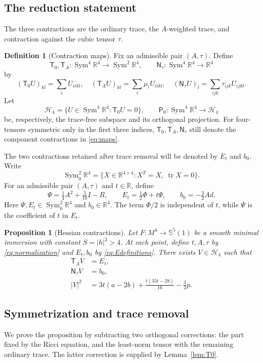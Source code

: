 \documentclass[11pt,a4paper]{amsart}
\numberwithin{equation}{section}
\newtheorem{proposition}[theorem]{Proposition}
\theoremstyle{definition}
\newtheorem{definition}[theorem]{Definition}
\theoremstyle{remark}
\DeclareMathOperator{\tr}{tr}
\DeclareMathOperator{\Sym}{Sym}
\newcommand{\R}{\mathbb R}
\newcommand{\Sph}{\mathbb S}
\newcommand{\T}{\mathsf T}
\newcommand{\N}{\mathsf N}
\newcommand{\Pz}{\mathsf P_0}
\newcommand{\Szero}{\operatorname{Sym}^2_0\R^4}
\newcommand{\Hfour}{\mathscr H_4}
\begin{document}
\subsection{The reduction statement}
The three contractions are the ordinary trace, the $A$-weighted trace,
and contraction against the cubic tensor $\tau$.

\begin{definition}[Contraction maps]\label{def:maps}
Fix an admissible pair $(A,\tau)$. Define
\[
 \T_0,\T_A:\Sym^4\R^4\longrightarrow\Sym^2\R^4,
 \qquad \N_\tau:\Sym^4\R^4\longrightarrow\R^4
\]
by
\begin{equation}\label{eq:maps}
 (\T_0U)_{kl}=\sum_iU_{iikl},\quad
 (\T_AU)_{kl}=\sum_i\mu_iU_{iikl},\quad
 (\N_\tau U)_l=\sum_{ijk}\tau_{ijk}U_{ijkl}.
\end{equation}
Let
\[
 \Hfour=\{U\in\Sym^4\R^4:\T_0U=0\},
 \qquad \Pz:\Sym^4\R^4\longrightarrow\Hfour
\]
be, respectively, the trace-free subspace and its orthogonal projection.
For four-tensors symmetric only in the first three indices,
$\T_0,\T_A,\N_\tau$ still denote the component contractions in
\eqref{eq:maps}.
\end{definition}

The two contractions retained after trace removal will be denoted by
$E_t$ and $b_0$. Write
\[
 \Szero=\{X\in\R^{4\times4}:X^T=X,\ \tr X=0\}.
\]
For an admissible pair $(A,\tau)$ and $t\in\R$, define
\begin{equation}\label{eq:Edefinitions}
 \Psi=\tfrac14A^2+\tfrac3{16}I-R,\qquad
 E_t=\tfrac12\Phi+t\Psi,\qquad b_0=-\tfrac32Ad.
\end{equation}
Here $\Psi,E_t\in\Szero$ and $b_0\in\R^4$. The term $\Phi/2$ is
independent of $t$, while $\Psi$ is the coefficient of $t$ in $E_t$.

\begin{proposition}[Hessian contractions]\label{prop:reduction}
Let $F:M^4\to\Sph^5(1)$ be a smooth minimal immersion with
constant $S=|h|^2>4$. At each point, define $t,A,\tau$ by
\eqref{eq:normalization} and $E_t,b_0$ by \eqref{eq:Edefinitions}.
There exists $V\in\Hfour$ such that
\begin{align}
 \T_AV&=E_t,\label{eq:Et}\\
 \N_\tau V&=b_0,\label{eq:b0}\\
 |V|^2&=3t(a-2b)+\frac{t(35t-28)}{16}-\tfrac32p.\label{eq:Vnorm}
\end{align}
\end{proposition}

\subsection{Symmetrization and trace removal}
We prove the proposition by subtracting two orthogonal corrections:
the part fixed by the Ricci equation, and the least-norm tensor with
the remaining ordinary trace. The latter correction is supplied by
Lemma~\ref{lem:T0}.
\end{document}
